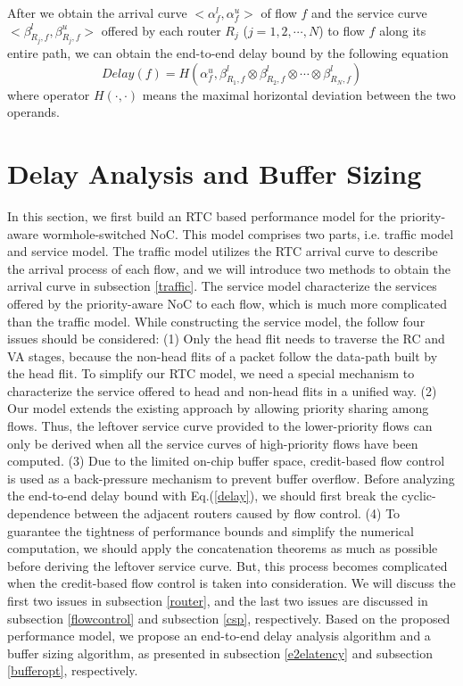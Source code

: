 \documentclass[10pt,journal]{IEEEtran}
\begin{document}
After we obtain the arrival curve $<\alpha^l_{f},\alpha^u_{f}>$ of flow $f$ and the service curve $<\beta_{R_j,f}^l,\beta_{R_j,f}^u>$ offered by each router $R_j$ ($j=1,2,\cdots,N$) to flow $f$ along its entire path, we can obtain the end-to-end delay bound by the following equation \cite{Boudec2001Network}
\begin{equation}\label{delay}
Delay(f)=H(\alpha^u_{f},\beta^l_{R_1,f}\otimes\beta^l_{R_2,f}\otimes\cdots\otimes\beta^l_{R_N,f})
\end{equation}
where operator $H(\cdot,\cdot)$ means the maximal horizontal deviation between the two operands.

\section{Delay Analysis and Buffer Sizing}\label{modeling}
In this section, we first build an RTC based performance model for the priority-aware wormhole-switched NoC. This model comprises two parts, i.e. traffic model and service model. The traffic model utilizes the RTC arrival curve to describe the arrival process of each flow, and we will introduce two methods to obtain the arrival curve in subsection \ref{traffic}. The service model characterize the services offered by the priority-aware NoC to each flow, which is much more complicated than the traffic model. While constructing the service model, the follow four issues should be considered: (1) Only the head flit needs to traverse the RC and VA stages, because the non-head flits of a packet follow the data-path built by the head flit. To simplify our RTC model, we need a special mechanism to characterize the service offered to head and non-head flits in a unified way. (2) Our model extends the existing approach \cite{73}\cite{Qian489900} by allowing priority sharing among flows. Thus, the leftover service curve provided to the lower-priority flows can only be derived when all the service curves of high-priority flows have been computed. (3) Due to the limited on-chip buffer space, credit-based flow control is used as a back-pressure mechanism to prevent buffer overflow. Before analyzing the end-to-end delay bound with Eq.(\ref{delay}), we should first break the cyclic-dependence between the adjacent routers caused by flow control. (4) To guarantee the tightness of performance bounds and simplify the numerical computation, we should apply the concatenation theorems as much as possible before deriving the leftover service curve. But, this process becomes complicated when the credit-based flow control is taken into consideration. We will discuss the first two issues in subsection \ref{router}, and the last two issues are discussed in subsection \ref{flowcontrol} and subsection \ref{csp}, respectively. Based on the proposed performance model, we propose an end-to-end delay analysis algorithm and a buffer sizing algorithm, as presented in subsection \ref{e2elatency} and subsection \ref{bufferopt}, respectively.
\end{document}
